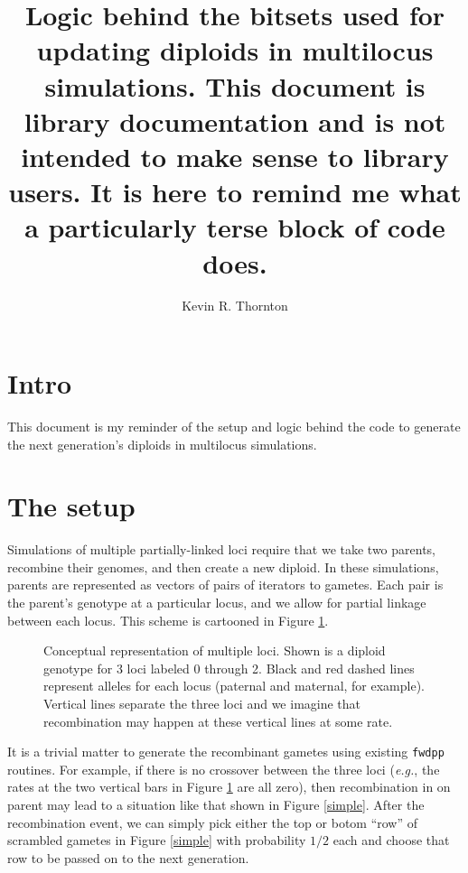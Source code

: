 \documentclass{article}
\title{Logic behind the bitsets used for updating diploids in multilocus simulations.  This document is \texbf{not} library documentation and is not intended to make sense to library users.  It is here to remind me what a particularly terse block of code does.}
\author[1]{Kevin R. Thornton}
\affil[1]{Department of Ecology and Evolutionary Biology, UC Irvine}
\date{}
\begin{document}
\maketitle
\section*{Intro}
This document is my reminder of the setup and logic behind the code to generate the next generation's diploids in multilocus simulations.
\section*{The setup}

Simulations of multiple partially-linked loci require that we take two parents, recombine their genomes, and then create a new diploid.  In these simulations, parents are represented as vectors of pairs of iterators to gametes.  Each pair is the parent's genotype at a particular locus, and we allow for partial linkage between each locus.  This scheme is cartooned in Figure \ref{concept}.

\begin{figure}[!h]
  \centering
  \caption{\label{concept}Conceptual representation of multiple loci.  Shown is a diploid genotype for 3 loci labeled 0 through 2.  Black and red dashed lines represent alleles for each locus (paternal and maternal, for example).  Vertical lines separate the three loci and we imagine that recombination may happen at these vertical lines at some rate.}
\end{figure}

It is a trivial matter to generate the recombinant gametes using existing \texttt{fwdpp} routines.  For example, if there is no crossover between the three loci (\textit{e.g.}, the rates at the two vertical bars in Figure \ref{concept} are all zero), then recombination in on parent may lead to a situation like that shown in Figure \ref{simple}.  After the recombination event, we can simply pick either the top or botom ``row'' of scrambled gametes in Figure \ref{simple} with probability $1/2$ each and choose that row to be passed on to the next generation.
  
\end{document}
